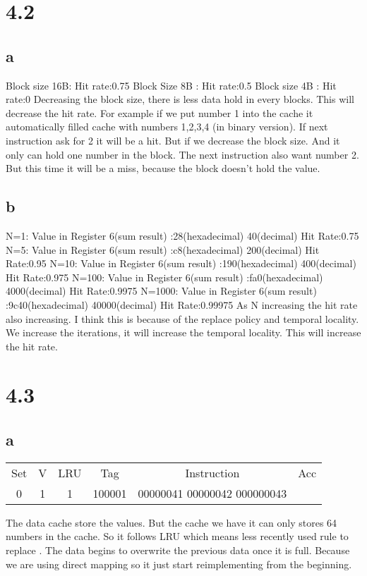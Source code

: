 \documentclass[]{article}
\begin{document}
\section*{4.2}
\subsection*{a}
Block size 16B: Hit rate:0.75 \newline
Block Size 8B : Hit rate:0.5\newline
Block size 4B : Hit rate:0 \newline
Decreasing the block size, there is less data hold in every blocks. This will decrease the hit rate. For example if we put number 1 into the cache it automatically filled cache with numbers 1,2,3,4 (in binary version). If next instruction ask for 2 it will be a hit. But if we decrease the block size. And it only can hold one number in the block. The next instruction also want number 2. But this time it will be a miss, because the block doesn't hold the value.\newline
\subsection*{b}
N=1: Value in Register 6(sum result) :28(hexadecimal) 40(decimal) Hit Rate:0.75\newline
N=5: Value in Register 6(sum result) :c8(hexadecimal) 200(decimal) Hit Rate:0.95\newline
N=10: Value in Register 6(sum result) :190(hexadecimal) 400(decimal) Hit Rate:0.975\newline
N=100: Value in Register 6(sum result) :fa0(hexadecimal) 4000(decimal) Hit Rate:0.9975\newline
N=1000: Value in Register 6(sum result) :9c40(hexadecimal) 40000(decimal) Hit Rate:0.99975\newline
As N increasing the hit rate also increasing. I think this is because of the replace policy and temporal locality. We increase the iterations, it will increase the temporal locality. This will increase the hit rate.\newline
\section*{4.3}
\subsection*{a}
\begin{center}
\begin{tabular}{c c c c c c}
	Set & V & LRU & Tag & Instruction & Acc \\
	0 & 1 & 1 & 100001 & 00000041 00000042 000000043&\\
	\end{tabular}
\end{center}
The data cache store the values. But the cache we have it can only stores 64 numbers in the cache. So it follows LRU which means less recently used rule to replace . The data begins to overwrite the previous data once it is full. Because we are using direct mapping so it just start reimplementing from the beginning. \newline
\end{document}
